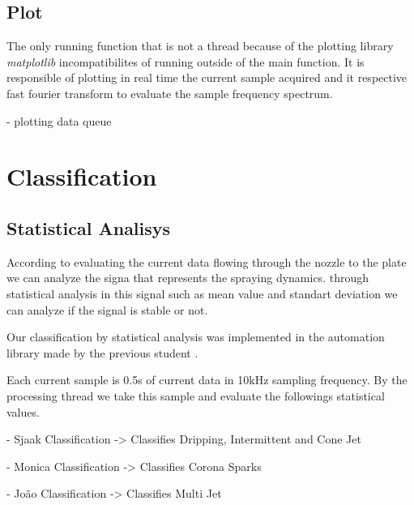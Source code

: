     \subsection{Plot}

        The only running function that is not a thread because of the plotting library \emph{matplotlib} incompatibilites of running outside of the main function. 
        It is responsible of plotting in real time the current sample acquired and it respective fast fourier transform to evaluate the sample frequency spectrum.



    
    
    - plotting data queue


\section{Classification}
\label{sec:section_classification}

\subsection{Statistical Analisys}

 According to \cite{Sjaaks} evaluating the current data flowing through the nozzle to the plate we can analyze the signa that represents the spraying dynamics.
 through statistical analysis in this signal such as mean value and standart deviation we can analyze if the signal is stable or not.

 Our classification by statistical analysis was implemented in the automation library made by the previous student \cite{Monica}.

 Each current sample is 0.5s of current data in 10kHz sampling frequency.
 By the processing thread we take this sample and evaluate the followings statistical values.
        
        - Sjaak Classification -> Classifies Dripping, Intermittent and Cone Jet
        
        - Monica Classification -> Classifies Corona Sparks

        - João Classification -> Classifies Multi Jet

